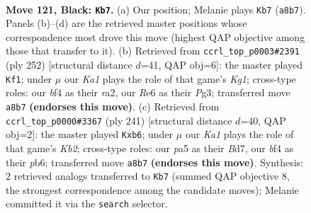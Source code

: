 \documentclass[11pt]{article}
\begin{document}
\begin{figure}[p]\centering
\begin{subfigure}{0.46\textwidth}\centering
\resizebox{\linewidth}{!}{%
\newchessgame
\chessboard[
  setfen={k6K/8/p3r3/P2n1p2/5B1p/N5Pb/8/R7 b - - 3 121},
  showmover=false,
  pgfstyle=straightmove, color=movearrow, markmove={a8-b7}
]}
\caption{}
\end{subfigure}\hfill
\begin{subfigure}{0.46\textwidth}\centering
\resizebox{\linewidth}{!}{%
\newchessgame
\chessboard[
  setfen={5k2/4b3/6p1/3R3p/4N2P/5PP1/r7/6K1 w - - 77 127},
  showmover=false,
  pgfstyle=straightmove, color=movearrow, markmove={g1-f1}
]}
\caption{}
\end{subfigure}
\\[4pt]
\begin{subfigure}{0.46\textwidth}\centering
\resizebox{\linewidth}{!}{%
\newchessgame
\chessboard[
  setfen={8/1k1b4/1P4p1/3pB3/p1r5/P3KP2/8/4R3 b - - 0 121},
  showmover=false,
  pgfstyle=straightmove, color=movearrow, markmove={b7-b6}
]}
\caption{}
\end{subfigure}\hfill

\caption{\textbf{Move 121, Black: \texttt{Kb7}.} (a) Our position; Melanie plays \texttt{Kb7} (\texttt{a8b7}). Panels (b)--(d) are the retrieved master positions whose correspondence most drove this move (highest QAP objective among those that transfer to it). (b) Retrieved from \texttt{ccrl\_top\_p0003\#2391} (ply 252) [structural distance $d$=41, QAP obj=6]: the master played \texttt{Kf1}; under $\mu$ our \emph{Ka1} plays the role of that game's \emph{Kg1}; cross-type roles: our \emph{b}f4 as their \emph{r}a2, our \emph{R}e6 as their \emph{P}g3; transferred move \texttt{a8b7} \textbf{(endorses this move)}. (c) Retrieved from \texttt{ccrl\_top\_p0000\#3367} (ply 241) [structural distance $d$=40, QAP obj=2]: the master played \texttt{Kxb6}; under $\mu$ our \emph{Ka1} plays the role of that game's \emph{Kb2}; cross-type roles: our \emph{p}a5 as their \emph{B}d7, our \emph{b}f4 as their \emph{p}b6; transferred move \texttt{a8b7} \textbf{(endorses this move)}. Synthesis: 2 retrieved analogs transferred to \texttt{Kb7} (summed QAP objective 8, the strongest correspondence among the candidate moves); Melanie committed it via the \texttt{search} selector.}
\label{fig:thought-m241}
\end{figure}

\clearpage
\end{document}
